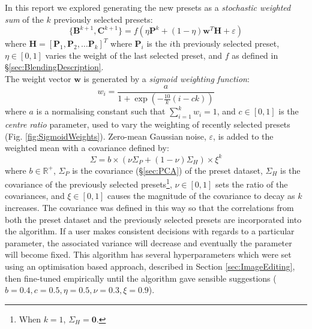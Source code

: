 \documentclass[11pt, oneside]{report}   	%
\renewcommand{\vec}[1]{\mathbf{#1}}
\begin{document}
\vspace{-10pt}In this report we explored generating the new presets as a \emph{stochastic weighted sum} of the $k$ previously selected presets:
\begin{equation}
\{\vec{B}^{k+1}, \vec{C}^{k+1}\} = f(\eta\vec{P}^k + (1-\eta)\vec{w}^T\vec{H} + \varepsilon) 
\end{equation}
where  $\vec{H} = [\vec{P}_1, \vec{P}_2, \dots \vec{P}_k]^T$ where $\vec{P}_i$ is the $i$th previously selected preset, $\eta\in[0, 1]$ varies the weight of the last selected preset, and $f$ as defined in \S \ref{sec:BlendingDescription}.\\
 The weight vector $\vec{w}$ is generated by a \emph{sigmoid weighting function}:
\begin{equation}
	w_i = \frac{a}{1 + \exp\left(-\frac{10}{k}(i-ck)\right)}
\end{equation}
where $a$ is a normalising constant such that $\sum_{i=1}^{k}w_i =1$, and $c\in [0, 1]$ is the \emph{centre ratio} parameter, used to vary the weighting of recently selected presets (Fig. \ref{fig:SigmoidWeights}).
%
Zero-mean Gaussian noise, $\varepsilon$, is added to the weighted mean with a covariance defined by:
\begin{equation}
\Sigma = b\times(\nu\Sigma_P + (1-\nu)\Sigma_H)\times\xi^k
\end{equation}
where $b\in\mathbb{R}^+$, $\Sigma_P$ is the covariance (\S \ref{sec:PCA}) of the preset dataset, $\Sigma_H$ is the covariance of the previously selected presets\footnote{When $k =1$, $\Sigma_H = \vec{0}$.}, $\nu \in [0, 1]$ sets the ratio of the covariances, and $\xi \in [0, 1]$ causes the magnitude of the covariance to decay as $k$ increases. The covariance was defined in this way so that the correlations from both the preset dataset and the previously selected presets are incorporated into the algorithm. If a user makes consistent decisions with regards to a particular parameter, the associated variance will decrease and eventually the parameter will become fixed. This algorithm has several hyperparameters which were set using an optimisation based approach, described in Section \ref{sec:ImageEditing}, then fine-tuned empirically until the algorithm gave sensible suggestions ($b=0.4, c=0.5, \eta=0.5,  \nu=0.3, \xi=0.9$).
\vspace{-8pt}
\end{document}
